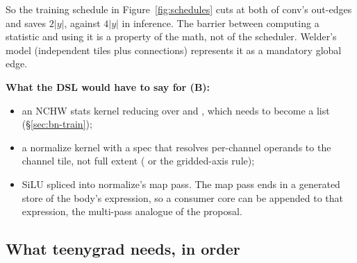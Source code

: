 So the training schedule in Figure~\ref{fig:schedules} cuts at both of conv's out-edges
and saves $2|y|$, against $4|y|$ in inference. The barrier between computing a
statistic and using it is a property of the math, not of the scheduler. Welder's model
(independent tiles plus connections) represents it as a mandatory global edge.

\textbf{What the DSL would have to say for (B):}
\begin{itemize}
\item an NCHW stats kernel reducing over  and , which needs
   to become a list (\S\ref{sec:bn-train});
\item a normalize kernel with a spec that resolves per-channel operands to the
  channel tile, not full extent ( or the gridded-axis rule);
\item SiLU spliced into normalize's map pass. The map pass ends in a generated store
  of the body's expression, so a consumer core can be appended to that expression,
  the multi-pass analogue of the  proposal.
\end{itemize}

\subsection{What teenygrad needs, in order}
\label{sec:needs}

